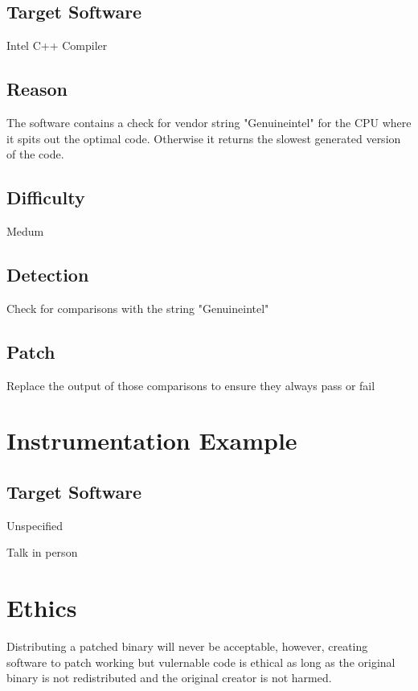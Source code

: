 \subsection{Target Software}
Intel C++ Compiler 
\subsection{Reason}
The software contains a check for vendor string "Genuineintel" for the CPU where it spits out the optimal code. Otherwise it returns the slowest generated version of the code.
\subsection{Difficulty}
Medum
\subsection{Detection}
Check for comparisons with the string "Genuineintel"
\subsection{Patch}
Replace the output of those comparisons to ensure they always pass or fail

\section{Instrumentation Example}
\subsection{Target Software}
Unspecified

Talk in person

\section{Ethics}
Distributing a patched binary will never be acceptable, however, creating software to patch working but vulernable code is ethical as long as the original binary is not redistributed and the original creator is not harmed. 








